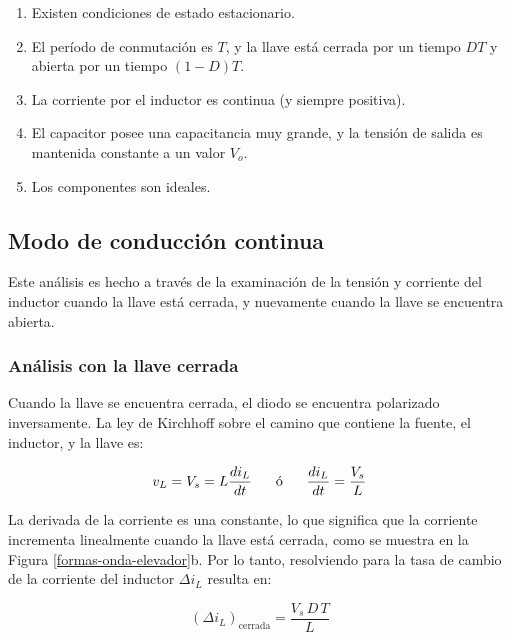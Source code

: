 \begin{enumerate}
    \item Existen condiciones de estado estacionario.
    \item El período de conmutación es $T$, y la llave está cerrada por un tiempo $DT$ y abierta por un tiempo $(1-D)T$.
    \item La corriente por el inductor es continua (y siempre positiva).
    \item El capacitor posee una capacitancia muy grande, y la tensión de salida es mantenida constante a un valor $V_o$.
    \item Los componentes son ideales.
\end{enumerate}

\subsection{Modo de conducción continua}

Este análisis es hecho a través de la examinación de la tensión y corriente del inductor cuando la llave está cerrada, y nuevamente cuando la llave se encuentra abierta.

\subsubsection{Análisis con la llave cerrada}

Cuando la llave se encuentra cerrada, el diodo se encuentra polarizado inversamente. La ley de Kirchhoff sobre el camino que contiene la fuente, el inductor, y la llave es:
 
\begin{equation}
    v_L = V_s = L \frac{di_L}{dt} \hspace{0.6cm} \textrm{ó} \hspace{0.6cm} \frac{di_L}{dt} = \frac{V_s}{L}
\end{equation}

La derivada de la corriente es una constante, lo que significa que la corriente incrementa linealmente cuando la llave está cerrada, como se muestra en la Figura \ref{formas-onda-elevador}b. Por lo tanto, resolviendo para la tasa de cambio de la corriente del inductor $\Delta i_L$ resulta en:

\begin{equation}
    \boxed{(\Delta i_L)_{\mathrm{cerrada}} = \frac{V_s \, D \, T}{L}}
    \label{llave-cerrada}
\end{equation}

